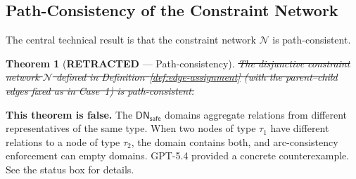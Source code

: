 \documentclass[a4paper,11pt]{article}
\newtheorem{theorem}{Theorem}[section]
\theoremstyle{definition}
\newcommand{\DN}{\ensuremath{\mathsf{DN}}}
\begin{document}
\subsection{Path-Consistency of the Constraint Network}

The central technical result is that the constraint network
$\mathcal{N}$ is path-consistent.

\begin{theorem}[\textbf{RETRACTED} --- Path-consistency]
\label{thm:path-consistent}
\sout{The disjunctive constraint network $\mathcal{N}$ defined in
Definition~\ref{def:edge-assignment} \textup{(}with the parent--child
edges fixed as in Case~1\textup{)} is path-consistent.}
\end{theorem}

\noindent
\textbf{This theorem is false.}  The $\DN_{\mathsf{safe}}$ domains
aggregate relations from different representatives of the same type.
When two nodes of type $\tau_1$ have different relations to a node of
type $\tau_2$, the domain contains both, and arc-consistency
enforcement can empty domains.  GPT-5.4 provided a concrete
counterexample.  See the status box for details.
\end{document}
